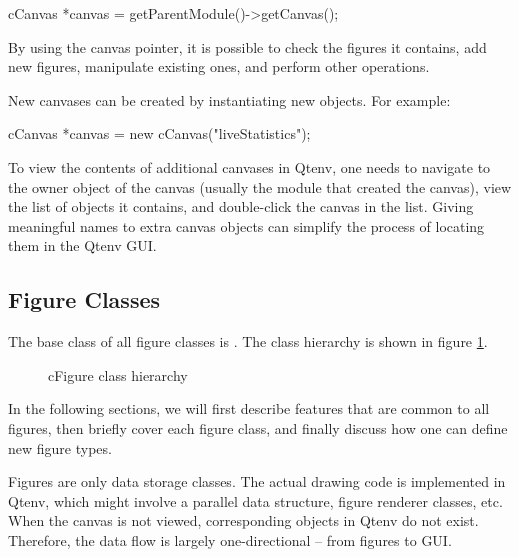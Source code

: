 \begin{cpp}
cCanvas *canvas = getParentModule()->getCanvas();
\end{cpp}

By using the canvas pointer, it is possible to check the figures it contains,
add new figures, manipulate existing ones, and perform other operations.

New canvases can be created by instantiating new  objects. For example:

\begin{cpp}
cCanvas *canvas = new cCanvas("liveStatistics");
\end{cpp}

To view the contents of additional canvases in Qtenv, one needs to navigate to
the owner object of the canvas (usually the module that created the canvas),
view the list of objects it contains, and double-click the canvas in the list.
Giving meaningful names to extra canvas objects can simplify the process of
locating them in the Qtenv GUI.


\subsection{Figure Classes}
\label{sec:graphics:figure-classes}

The base class of all figure classes is . The class hierarchy is
shown in figure \ref{fig:figure-inheritance}.

\begin{figure}[htbp]
  \begin{center}
    
    \caption{cFigure class hierarchy}
    \label{fig:figure-inheritance}
  \end{center}
\end{figure}

In the following sections, we will first describe features that are common to
all figures, then briefly cover each figure class, and finally discuss how one
can define new figure types.

\begin{note}
Figures are only data storage classes. The actual drawing code is implemented in
Qtenv, which might involve a parallel data structure, figure renderer classes,
etc. When the canvas is not viewed, corresponding objects in Qtenv do not exist.
Therefore, the data flow is largely one-directional -- from figures to GUI.
\end{note}



